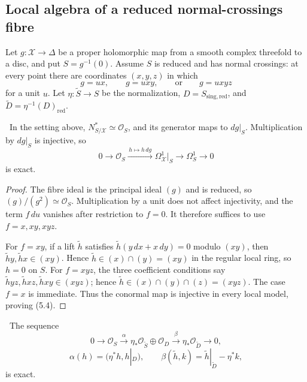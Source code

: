 \subsection{Local algebra of a reduced normal-crossings fibre}

Let $g:\mathcal X\to\Delta$ be a proper holomorphic map from a smooth complex
threefold to a disc, and put $S=g^{-1}(0)$.  Assume $S$ is reduced and has
normal crossings: at every point there are coordinates $(x,y,z)$ in which
\[
g=ux,\qquad g=uxy,\qquad\text{or}\qquad g=uxyz
\tag{5.3}
\]
for a unit $u$.  Let $\eta:\widetilde S\to S$ be the normalization,
$D=S_{\mathrm{sing,red}}$, and $\widetilde D=\eta^{-1}(D)_{\mathrm{red}}$.

\begin{lemma}\label{lem:conormal-injective}
\Verified\ In the setting above, $N^*_{S/\mathcal X}\simeq\mathcal O_S$,
and its generator maps to $dg|_S$.  Multiplication by $dg|_S$ is injective,
so
\[
0\longrightarrow\mathcal O_S
\xrightarrow{\,h\mapsto h\,dg\,}
\Omega^1_{\mathcal X}|_S\longrightarrow\Omega^1_S\longrightarrow0
\tag{5.4}
\]
is exact.
\end{lemma}

\begin{proof}
The fibre ideal is the principal ideal $(g)$ and is reduced, so
$(g)/(g^2)\simeq\mathcal O_S$.  Multiplication by a unit does not affect
injectivity, and the term $f\,du$ vanishes after restriction to $f=0$.
It therefore suffices to use $f=x,xy,xyz$.

For $f=xy$, if a lift $\widetilde h$ satisfies
$\widetilde h(y\,dx+x\,dy)=0$ modulo $(xy)$, then
$\widetilde h y,\widetilde h x\in(xy)$.  Hence
$\widetilde h\in(x)\cap(y)=(xy)$ in the regular local ring, so $h=0$ on
$S$.  For $f=xyz$, the three coefficient conditions say
$\widetilde h yz,\widetilde h xz,\widetilde h xy\in(xyz)$; hence
$\widetilde h\in(x)\cap(y)\cap(z)=(xyz)$.  The case $f=x$ is immediate.
Thus the conormal map is injective in every local model, proving (5.4).
\end{proof}

\begin{lemma}
\label{lem:conductor-square}
\Verified\ The sequence
\[
0\longrightarrow\mathcal O_S
\xrightarrow{\alpha}
\eta_*\mathcal O_{\widetilde S}\oplus\mathcal O_D
\xrightarrow{\beta}
\eta_*\mathcal O_{\widetilde D}
\longrightarrow0,
\tag{5.5}
\]
\[
\alpha(h)=(\eta^*h,h|_D),\qquad
\beta(\widetilde h,k)=
\widetilde h|_{\widetilde D}-\eta^*k,
\]
is exact.
\end{lemma}

